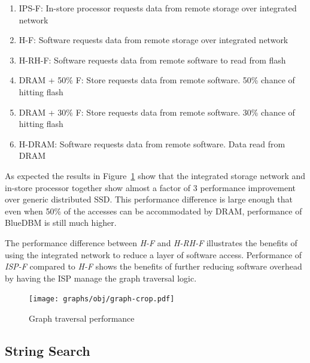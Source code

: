 \begin{enumerate}
\item IPS-F:  In-store processor requests data from remote storage over integrated network
\item H-F:  Software requests data from remote storage over integrated network 
\item H-RH-F:  Software requests data from remote software to read from flash
\item DRAM + 50\% F:  Store requests data from remote software. 50\% chance of hitting flash
\item DRAM + 30\% F:  Store requests data from remote software. 30\% chance of hitting flash
\item H-DRAM:  Software requests data from remote software. Data read from DRAM 
\end{enumerate}

As expected the results in Figure~\ref{fig:result_graph} show that the integrated storage network and in-store processor together show almost a factor of 3 performance improvement over generic distributed SSD. This performance difference is large enough that even when 50\% of the accesses can be accommodated by DRAM, performance of BlueDBM is still much higher.

The performance difference between \emph{H-F} and \emph{H-RH-F} illustrates the benefits of using the integrated network to reduce a layer of software access. Performance of \emph{ISP-F} compared to \emph{H-F} shows the benefits of further reducing software overhead by having the ISP manage the graph traversal logic. 
	
\begin{figure}[t]
	\centering
	\texttt{[image: graphs/obj/graph-crop.pdf]}
	\caption{Graph traversal performance}
	\label{fig:result_graph}
\end{figure}

%

\subsection{String Search}

